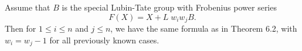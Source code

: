 Assume that $B$ is the special Lubin-Tate group with Frobenius power series
$$F(X) = X + L \; w_i w_j B.$$
Then for $1 \le i \le n$ and $j \le n$, we have the same formula as in Theorem 6.2, with $w_i = w_j - 1$ for all previously known cases.
